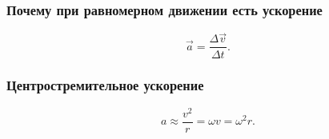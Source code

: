 \documentclass[12pt, a4paper]{article}
\begin{document}
\subsubsection*{Почему при равномерном движении есть ускорение}

\[
\vec a = \frac{\Delta\vec v}{\Delta t}.
\]

\subsubsection*{Центростремительное ускорение}

\[
a \approx \frac{v^2}{r} = \omega v = \omega^2 r.
\]
\end{document}
